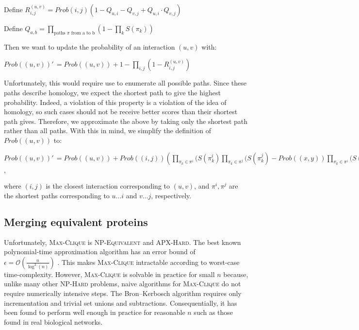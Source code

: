 \documentclass[12pt,twoside]{article}
\def\NI{\noindent}
\begin{document}
Define
$R_{i,j}^{(u,v)} = Prob(i,j) \left(1 - \displaystyle Q_{u,i} - Q_{v,j} + Q_{u,i} \cdot Q_{v,j} \right)$

\NI Define $Q_{a,b} = \displaystyle \prod_{\text{paths } \pi \text{ from a to b}} \left( 1 - \prod_{k} S(\pi_k) \right)$

\NI Then we want to update the probability of an interaction $(u,v)$ with:

\NI $Prob((u,v))'\,\! = Prob((u,v)) + 1 - \displaystyle \prod_{i,j}(1 - R_{i,j}^{(u,v)})$

\NI Unfortunately, this would require use to enumerate all possible paths. Since these paths describe homology, we expect the shortest path to give the highest probability. Indeed, a violation of this property is a violation of the idea of homology, so such cases should not be receive better scores than their shortest path gives. Therefore, we approximate the above by taking only the shortest path rather than all paths. With this in mind, we simplify the definition of $Prob((u,v))$ to:

\NI $Prob((u,v))'\,\! = Prob((u,v)) + \displaystyle Prob((i,j)) \left( \prod_{\pi_k \in \pi^i}(S(\pi_k^i) \prod_{\pi_k \in \pi^j}(S(\pi_k^j) - Prob((x,y)) \prod_{\pi_k \in \pi^i}(S(\pi_k^i) \prod_{\pi_k \in \pi^j}(S(\pi_k^j) \right)$,

\NI where $(i,j)$ is the closest interaction corresponding to $(u,v)$, and $\pi^i, \pi^j$ are the shortest paths corresponding to $u \ldots i$ and $v \ldots j$, respectively.

\subsection{Merging equivalent proteins}

\NI Unfortunately, \textsc{Max-Clique} is \textsc{NP-Equivalent} and \textsc{APX-Hard}. The best known polynomial-time approximation algorithm has an error bound of $\epsilon = \mathcal O \left(\frac{n}{\log^2(n)}\right)$ \cite{boppana}. This makes \textsc{Max-Clique} intractable according to worst-case time-complexity. However, \textsc{Max-Clique} is solvable in practice for small $n$ because, unlike many other \textsc{NP-Hard} problems, naive algorithms for \textsc{Max-Clique} do not require numerically intensive steps. The Bron--Kerbosch algorithm requires only incrementation and trivial set unions and subtractions. Consequentially, it has been found to perform well enough in practice for reasonable $n$ such as those found in real biological networks.
\end{document}
